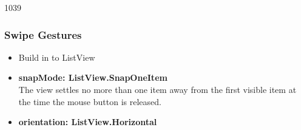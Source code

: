 \begin{slide}{1039}\frametitle{Swipe Gestures}

\begin{itemize}
\item Build in to ListView\medskip

\item \textbf{snapMode: ListView.SnapOneItem}\\
    The view settles no more than one item away from the first visible item at the time the mouse button is released.\medskip

\item \textbf{orientation: ListView.Horizontal}
\end{itemize}
\end{slide}

